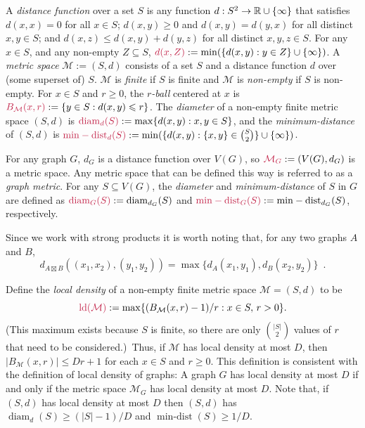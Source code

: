 \documentclass{patmorin}
\makeatletter
\renewcommand{\ge}{\geqslant}
\renewcommand{\le}{\leqslant}
\renewcommand{\geq}{\geqslant}
\newcommand{\defin}[1]{\emph{\textcolor{brightmaroon}{#1}}}
\def\mathcolor#1#{\@mathcolor{#1}}
\def\@mathcolor#1#2#3{%
  \protect\leavevmode
  \begingroup
    \color#1{#2}#3%
  \endgroup
}
\newcommand{\mathdefin}[1]{\mathcolor{brightmaroon}{#1}}
\DeclareMathOperator{\diam}{diam}
\DeclareMathOperator{\mindist}{min-dist}
\DeclareMathOperator{\ld}{ld}
\makeatother
\begin{document}
A \defin{distance function} over a set $S$ is any function $d:S^2\to\mathbb{R}\cup\{\infty\}$ that satisfies $d(x,x)=0$ for all $x\in S$; $d(x,y)\ge 0$ and $d(x,y)=d(y,x)$ for all distinct $x,y\in S$; and $d(x,z) \le d(x,y)+d(y,z)$ for all distinct $x,y,z\in S$.  For any $x\in S$, and any non-empty $Z\subseteq S$, $\mathdefin{d(x,Z)}:=\min(\{d(x,y):y\in Z\}\cup\{\infty\})$.  A \defin{metric space} $\mathcal{M}:=(S,d)$ consists of a set $S$ and a distance function $d$ over (some superset of) $S$.
$\mathcal{M}$ is \defin{finite} if $S$ is finite and $\mathcal{M}$ is \defin{non-empty} if $S$ is non-empty.  For $x\in S$ and $r\geq 0$, the \defin{$r$-ball} centered at $x$ is $\mathdefin{B_{\mathcal{M}}(x,r)}:=\{y\in S:d(x,y)\le r\}$.  The \defin{diameter} of a non-empty finite metric space $(S,d)$ is $\mathdefin{\diam_d(S)}:=\max\{d(x,y):x,y\in S\}$, and the
\defin{minimum-distance} of $(S,d)$ is $\mathdefin{\mindist_d(S)}:=\min(\{d(x,y): \{x,y\}\in\binom{S}{2}\}\cup\{\infty\})$.

For any graph $G$, $d_G$ is a distance function over $V(G)$, so $\mathdefin{\mathcal{M}_G}:=(V(G),d_G)$ is a metric space. Any metric space that can be defined this way is referred to as a \defin{graph metric}. For any $S\subseteq V(G)$, the \defin{diameter} and \defin{minimum-distance} of $S$ in $G$ are defined as $\mathdefin{\diam_G(S)}:=\diam_{d_G}(S)$ and $\mathdefin{\mindist_G(S)}:=\mindist_{d_G}(S)$, respectively.


Since we work with strong products it is worth noting that, for any two graphs $A$ and $B$,
\[
  d_{A\boxtimes B}((x_1,x_2),(y_1,y_2))=\max\{d_A(x_1,y_1),d_B(x_2,y_2)\} \enspace .
\]

Define the \defin{local density} of a non-empty finite metric space  $\mathcal{M}=(S,d)$ to be
\[
  \mathdefin{\ld(\mathcal{M})}:=\max\{(B_{\mathcal{M}}(x,r)-1)/r:x\in S,\, r>0\}. 
\]
(This maximum exists because $S$ is finite, so there are only $\binom{|S|}{2}$ values of $r$ that need to be considered.)\ 
Thus, if $\mathcal{M}$ has local density at most $D$,  then $|B_{\mathcal{M}}(x,r)|\le Dr+1$ for each $x\in S$ and $r\ge 0$.
This definition is consistent with the definition of local density of graphs:  A graph $G$ has local density at most $D$ if and only if the metric space $\mathcal{M}_G$ has local density at most $D$.  Note that, if $(S,d)$ has local density at most $D$ then $(S,d)$ has $\diam_d(S)\ge (|S|-1)/D$ and $\mindist(S)\ge 1/D$.
\end{document}
